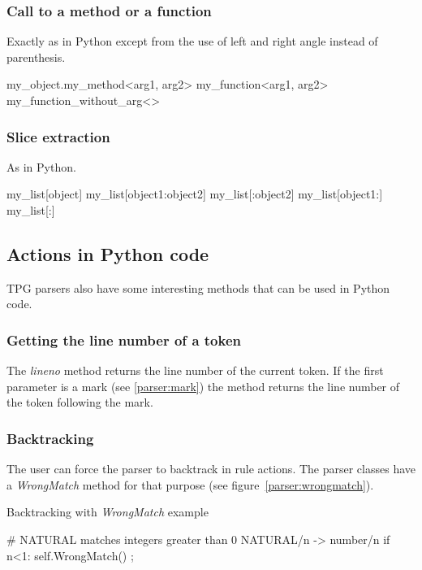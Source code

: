 \subsubsection{Call to a method or a function}

Exactly as in Python except from the use of left and right angle instead of parenthesis.

\begin{verbatimtab}[4]
	my_object.my_method<arg1, arg2>
	my_function<arg1, arg2>
	my_function_without_arg<>
\end{verbatimtab}

\subsubsection{Slice extraction}

As in Python.

\begin{verbatimtab}[4]
	my_list[object]
	my_list[object1:object2]
	my_list[:object2]
	my_list[object1:]
	my_list[:]
\end{verbatimtab}

\subsection{Actions in Python code}

TPG parsers also have some interesting methods that can be used in Python code.

\subsubsection{Getting the line number of a token}

The \emph{lineno} method returns the line number of the current token.
If the first parameter is a mark (see \ref{parser:mark}) the method returns the line number of the token following the mark.

\subsubsection{Backtracking}

The user can force the parser to backtrack in rule actions.
The parser classes have a \emph{WrongMatch} method for that purpose (see figure~\ref{parser:wrongmatch}).

\begin{code}
\caption{Backtracking with \emph{WrongMatch} example}			\label{parser:wrongmatch}
\begin{verbatimtab}[4]
	# NATURAL matches integers greater than 0
	NATURAL/n ->
		number/n
		{{ if n<1: self.WrongMatch() }}
		;
\end{verbatimtab}
\end{code}

